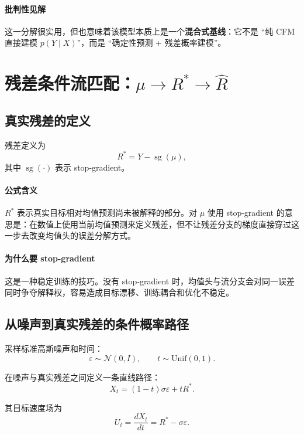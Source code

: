 \documentclass[11pt,a4paper]{ctexart}
\newcommand{\sg}{\operatorname{sg}}
\begin{document}
\paragraph{批判性见解}
这一分解很实用，但也意味着该模型本质上是一个\textbf{混合式基线}：它不是 ``纯 CFM 直接建模 $p(Y\mid X)$''，而是 ``确定性预测 + 残差概率建模''。

\section{残差条件流匹配：$\mu \rightarrow R^{*} \rightarrow \hat{R}$}

\subsection{真实残差的定义}

残差定义为
\begin{equation}
R^{*} = Y - \sg(\mu),
\end{equation}
其中 $\sg(\cdot)$ 表示 stop-gradient。

\paragraph{公式含义}
$R^{*}$ 表示真实目标相对均值预测尚未被解释的部分。对 $\mu$ 使用 stop-gradient 的意思是：在数值上使用当前均值预测来定义残差，但不让残差分支的梯度直接穿过这一步去改变均值头的误差分解方式。

\paragraph{为什么要 stop-gradient}
这是一种稳定训练的技巧。没有 stop-gradient 时，均值头与流分支会对同一误差同时争夺解释权，容易造成目标漂移、训练耦合和优化不稳定。

\subsection{从噪声到真实残差的条件概率路径}

采样标准高斯噪声和时间：
\begin{equation}
\varepsilon \sim \mathcal{N}(0,I), \qquad t \sim \mathrm{Unif}(0,1).
\end{equation}

在噪声与真实残差之间定义一条直线路径：
\begin{equation}
X_t = (1-t)\sigma \varepsilon + tR^{*}.
\end{equation}

其目标速度场为
\begin{equation}
U_t = \frac{dX_t}{dt} = R^{*} - \sigma \varepsilon.
\end{equation}
\end{document}
